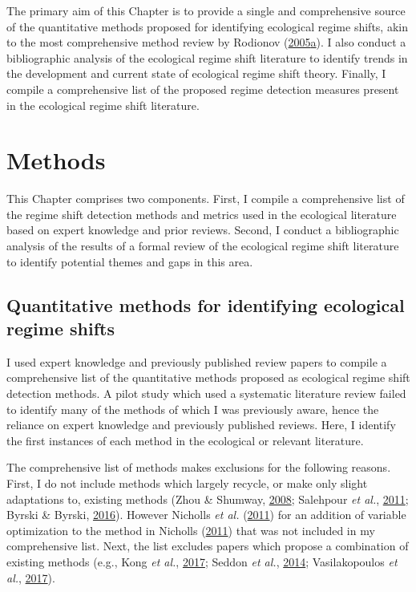 \documentclass[print]{nuthesis}
\begin{document}
The primary aim of this Chapter is to provide a single and comprehensive source of the quantitative methods proposed for identifying ecological regime shifts, akin to the most comprehensive method review by Rodionov (\protect\hyperlink{ref-rodionov_brief_2005}{2005}\protect\hyperlink{ref-rodionov_brief_2005}{a}). I also conduct a bibliographic analysis of the ecological regime shift literature to identify trends in the development and current state of ecological regime shift theory. Finally, I compile a comprehensive list of the proposed regime detection measures present in the ecological regime shift literature.

\hypertarget{methods}{%
\section{Methods}\label{methods}}

This Chapter comprises two components. First, I compile a comprehensive list of the regime shift detection methods and metrics used in the ecological literature based on expert knowledge and prior reviews. Second, I conduct a bibliographic analysis of the results of a formal review of the ecological regime shift literature to identify potential themes and gaps in this area.

\hypertarget{revMeth1}{%
\subsection{Quantitative methods for identifying ecological regime shifts}\label{revMeth1}}

I used expert knowledge and previously published review papers to compile a comprehensive list of the quantitative methods proposed as ecological regime shift detection methods. A pilot study which used a systematic literature review failed to identify many of the methods of which I was previously aware, hence the reliance on expert knowledge and previously published reviews. Here, I identify the first instances of each method in the ecological or relevant literature.

The comprehensive list of methods makes exclusions for the following reasons. First, I do not include methods which largely recycle, or make only slight adaptations to, existing methods (Zhou \& Shumway, \protect\hyperlink{ref-zhou2008one}{2008}; Salehpour \emph{et al.}, \protect\hyperlink{ref-salehpour2011line}{2011}; Byrski \& Byrski, \protect\hyperlink{ref-byrski2016double}{2016}). However Nicholls \emph{et al.} (\protect\hyperlink{ref-nicholls2011biological}{2011}) for an addition of variable optimization to the method in Nicholls (\protect\hyperlink{ref-nicholls_detection_2011}{2011}) that was not included in my comprehensive list. Next, the list excludes papers which propose a combination of existing methods (e.g., Kong \emph{et al.}, \protect\hyperlink{ref-kong2017hydrological}{2017}; Seddon \emph{et al.}, \protect\hyperlink{ref-seddon2014quantitative}{2014}; Vasilakopoulos \emph{et al.}, \protect\hyperlink{ref-vasilakopoulos2017resilience}{2017}).
\end{document}
